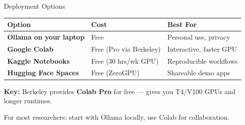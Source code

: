 \documentclass[aspectratio=169]{beamer}
\begin{document}
\begin{frame}{Deployment Options}
    \begin{table}
        \centering
        \begin{tabular}{@{}p{}p{}p{}@{}}
            \toprule
            \textbf{Option} & \textbf{Cost} & \textbf{Best For} \\
            \midrule
            \textbf{Ollama on your laptop} & Free & Personal use, privacy \\
            \addlinespace
            \textbf{Google Colab} & Free (Pro via Berkeley) & Interactive, faster GPU \\
            \addlinespace
            \textbf{Kaggle Notebooks} & Free (30 hrs/wk GPU) & Reproducible workflows \\
            \addlinespace
            \textbf{Hugging Face Spaces} & Free (ZeroGPU) & Shareable demo apps \\
            \bottomrule
        \end{tabular}
    \end{table}

    \vspace{0.5em}
    \textbf{Key:} Berkeley provides \textbf{Colab Pro} for free --- gives you T4/V100 GPUs and longer runtimes.

    \vspace{0.5em}
    For most researchers: start with Ollama locally, use Colab for collaboration.
\end{frame}
\end{document}
